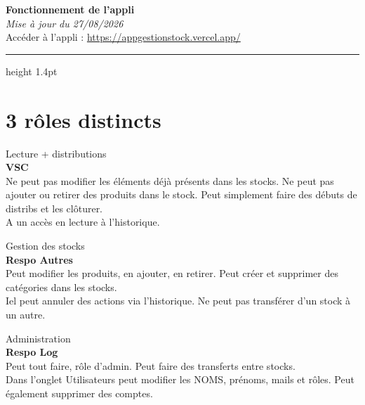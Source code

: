 \documentclass[11pt,a4paper]{article}
\begin{document}
\begin{center}
\begin{minipage}{\textwidth}
{\sffamily{}\selectfont\bfseries\huge\color{accent}Fonctionnement de l'appli}\\[3pt]
{\sffamily\itshape\small\color{muted}Mise à jour du 27/08/2026}\\[5pt]
{\sffamily\small Accéder à l'appli : \url{https://appgestionstock.vercel.app/}}
\end{minipage}
\end{center}
\vspace{2pt}
{\color{border}\hrule height 1.4pt}
\vspace{8pt}

\section{3 rôles distincts}

\begin{tcbraster}[raster columns=3, raster equal height=rows, raster column skip=8pt]
\begin{rolecard}
{\ttfamily\footnotesize\color{muted}Lecture + distributions}\\[6pt]
{\sffamily{}\selectfont\bfseries VSC}\\[6pt]
{\small Ne peut pas modifier les éléments déjà présents dans les stocks. Ne peut pas ajouter ou retirer des produits dans le stock. Peut simplement faire des débuts de distribs et les clôturer.}\\[6pt]
{\small A un accès en lecture à l'historique.}
\end{rolecard}
\begin{rolecard}
{\ttfamily\footnotesize\color{muted}Gestion des stocks}\\[6pt]
{\sffamily{}\selectfont\bfseries Respo Autres}\\[6pt]
{\small Peut modifier les produits, en ajouter, en retirer. Peut créer et supprimer des catégories dans les stocks.}\\[6pt]
{\small Iel peut annuler des actions via l'historique. Ne peut pas transférer d'un stock à un autre.}
\end{rolecard}
\begin{rolecard}[colframe=accent, boxrule=1.4pt]
{\ttfamily\footnotesize\color{muted}Administration}\\[6pt]
{\sffamily{}\selectfont\bfseries Respo Log}\\[6pt]
{\small Peut tout faire, rôle d'admin. Peut faire des transferts entre stocks.}\\[6pt]
{\small Dans l'onglet Utilisateurs peut modifier les NOMS, prénoms, mails et rôles. Peut également supprimer des comptes.}
\end{rolecard}
\end{tcbraster}
\end{document}

